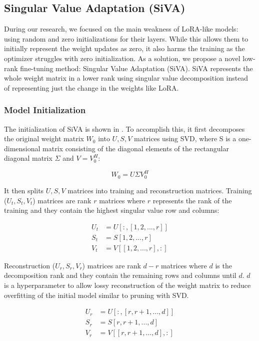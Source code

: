 \subsection{Singular Value Adaptation (SiVA)}

During our research, we focused on the main weakness of LoRA-like models: using random and zero initializations for their layers. While this allows them to initially represent the weight updates as zero, it also harms the training as the optimizer struggles with zero initialization. As a solution, we propose a novel low-rank fine-tuning method: Singular Value Adaptation (SiVA). SiVA represents the whole weight matrix in a lower rank using singular value decomposition instead of representing just the change in the weights like LoRA. 

\subsubsection{Model Initialization}
The initialization of SiVA is shown in . To accomplish this, it first decomposes the original weight matrix \(W_0\) into \(U, S, V\) matrices using SVD, where S is a one-dimensional matrix consisting of the diagonal elements of the rectangular diagonal matrix \(\Sigma\) and \(V = V_0^H\):

\begin{equation}
    W_0 = U \Sigma V_0^H
\end{equation}

It then splits \(U, S, V\) matrices into training and reconstruction matrices. Training (\(U_t, S_t, V_t\)) matrices are rank \(r\) matrices where \(r\) represents the rank of the training and they contain the highest singular value row and columns:

\begin{align}
    U_t &= U[:, [1, 2, ..., r]]\\
    S_t &= S[1, 2, ..., r]\\
    V_t &= V[[1, 2, ..., r],:]
\end{align}

Reconstruction (\(U_r, S_r, V_r\)) matrices are rank \(d-r\) matrices where \(d\) is the decomposition rank and they contain the remaining rows and columns until \(d\). \(d\) is a hyperparameter to allow lossy reconstruction of the weight matrix to reduce overfitting of the initial model similar to pruning with SVD.

\begin{align}
    U_r &= U[:, [r, r+1, ..., d]]\\
    S_r &= S[r, r+1, ..., d]\\
    V_r &= V[[r, r+1, ..., d],:]
\end{align}


